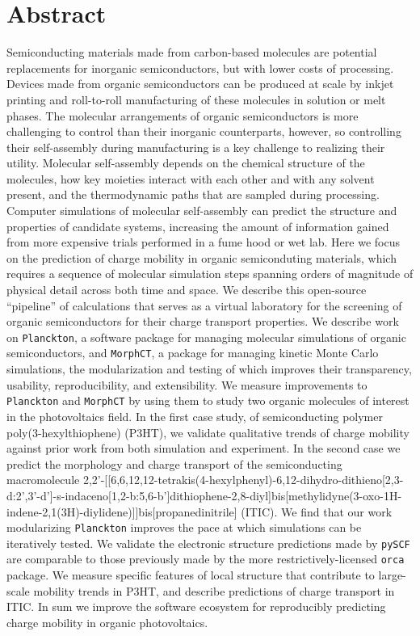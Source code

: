 
\chapter*{Abstract}

Semiconducting materials made from carbon-based molecules are potential replacements for inorganic semiconductors, but with lower costs of processing.
Devices made from organic semiconductors can be produced at scale by inkjet printing and roll-to-roll manufacturing of these molecules in solution or melt phases.  
The molecular arrangements of organic semiconductors is more challenging to control than their inorganic counterparts, however, so controlling their self-assembly during manufacturing is a key challenge to realizing their utility.
Molecular self-assembly depends on the chemical structure of the molecules, how key moieties interact with each other and with any solvent present, and the thermodynamic paths that are sampled during processing.
Computer simulations of molecular self-assembly can predict the structure and properties of candidate systems, increasing the amount of information gained from more expensive trials performed in a fume hood or wet lab.
Here we focus on the prediction of charge mobility in organic semiconduting materials, which requires a sequence of molecular simulation steps spanning orders of magnitude of physical detail across both time and space.
We describe this open-source ``pipeline'' of calculations that serves as a virtual laboratory for the screening of organic semiconductors for their charge transport properties.
We describe work on \texttt{Planckton}, a software package for managing molecular simulations of organic semiconductors, and \texttt{MorphCT}, a package for managing kinetic Monte Carlo simulations, the modularization and testing of which improves their transparency, usability, reproducibility, and extensibility.
We measure improvements to \texttt{Planckton} and \texttt{MorphCT} by using them to study two organic molecules of interest in the photovoltaics field.
In the first case study, of semiconducting polymer poly(3-hexylthiophene) (P3HT), we validate qualitative trends of charge mobility against prior work from both simulation and experiment.
In the second case we predict the morphology and charge transport of the semiconducting macromolecule 
2,2'-[[6,6,12,12-tetrakis(4-hexylphenyl)-6,12-dihydro-dithieno[2,3-d:2',3'-d']-s-indaceno[1,2-b:5,6-b']dithiophene-2,8-diyl]bis[methylidyne(3-oxo-1H-indene-2,1(3H)-diylidene)]]bis[propanedinitrile] (ITIC).
We find that our work modularizing \texttt{Planckton} improves the pace at which simulations can be iteratively tested.
We validate the electronic structure predictions made by \texttt{pySCF} are comparable to those previously made by the more restrictively-licensed \texttt{orca} package.
We measure specific features of local structure that contribute to large-scale mobility trends in P3HT, and describe predictions of charge transport in ITIC.
In sum we improve the software ecosystem for reproducibly predicting charge mobility in organic photovoltaics.


